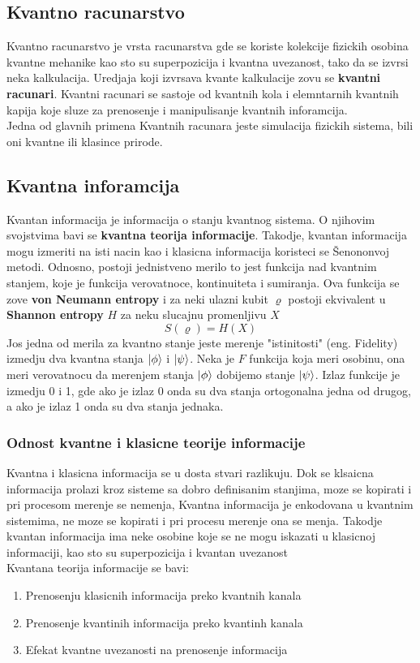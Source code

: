 \documentclass[12pt, letterpaper, oneside]{article}
\begin{document}
\subsection{Kvantno racunarstvo}
Kvantno racunarstvo je vrsta racunarstva gde se koriste kolekcije fizickih osobina kvantne mehanike kao sto su superpozicija i kvantna uvezanost,
tako da se izvrsi neka kalkulacija. Uredjaja koji izvrsava kvante kalkulacije zovu se \textbf{kvantni racunari}.
Kvantni racunari se sastoje od kvantnih kola i elemntarnih kvantnih kapija koje sluze za prenosenje i manipulisanje kvantnih inforamcija.
\cite{nielsen_chuang_10th} \\
Jedna od glavnih primena Kvantnih racunara jeste simulacija fizickih sistema, bili oni kvantne ili klasince prirode.
\subsection{Kvantna inforamcija}
Kvantan informacija je informacija o stanju kvantnog sistema. O njihovim svojstvima bavi se \textbf{kvantna teorija informacije}.
Takodje, kvantan informacija mogu izmeriti na isti nacin kao i klasicna informacija koristeci se Šenononvoj metodi. 
Odnosno, postoji jednistveno merilo to jest funkcija nad kvantnim stanjem, koje je funkcija verovatnoce, kontinuiteta i sumiranja.\cite{vlatko_v}
Ova funkcija se zove \textbf{von Neumann entropy} i za neki ulazni kubit $\varrho$ postoji ekvivalent u  \textbf{Shannon entropy} $H$
za neku slucajnu promenljivu $X$
\[
    S(\varrho) = H(X)
\]
Jos jedna od merila za kvantno stanje jeste merenje "istinitosti" (eng. Fidelity) izmedju dva kvantna stanja $ \ket{\phi}$ i $\ket{\psi}$.
Neka je $F$ funkcija koja meri osobinu, ona meri verovatnocu da merenjem stanja $\ket{\phi}$ dobijemo stanje $\ket{\psi}$.
Izlaz funkcije je izmedju 0 i 1, gde ako je izlaz 0 onda su dva stanja ortogonalna jedna od drugog, a ako je izlaz 1 onda su dva stanja jednaka.\cite{vlatko_v}
\subsubsection*{Odnost kvantne i klasicne teorije informacije}
Kvantna i klasicna informacija se u dosta stvari razlikuju. Dok se klsaicna informacija prolazi kroz sisteme sa dobro definisanim stanjima, moze se kopirati i pri procesom merenje se nemenja,
Kvantna informacija je enkodovana u kvantnim sistemima, ne moze se kopirati i pri procesu merenje ona se menja. Takodje kvantan informacija ima neke osobine koje se ne
mogu iskazati u klasicnoj informaciji, kao sto su superpozicija i kvantan uvezanost \cite{Classical&quantum_info} \\
Kvantana teorija informacije se bavi: 
\begin{enumerate}
    \item Prenosenju klasicnih informacija preko kvantnih kanala
    \item Prenosenje kvantinih informacija preko kvantinh kanala
    \item Efekat kvantne uvezanosti na prenosenje informacija
\end{enumerate}
\end{document}
